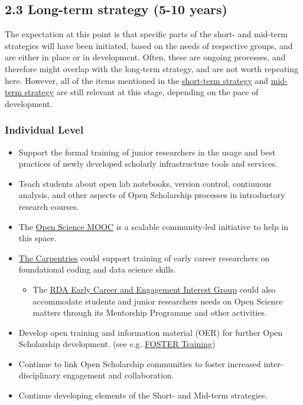 \subsection{2.3 Long-term strategy (5-10 years)
}\label{long-term-strategy-5-10-years}

The expectation at this point is that specific parts of the short- and
mid-term strategies will have been initiated, based on the needs of
respective groups, and are either in place or in development. Often,
these are ongoing processes, and therefore might overlap with the
long-term strategy, and are not worth repeating here. However, all of
the items mentioned in the \protect\hyperlink{Short}{short-term
strategy} and \protect\hyperlink{Middle}{mid-term strategy} are still
relevant at this stage, depending on the pace of development.

\subsubsection{Individual Level}\label{individual-level-2}

\begin{itemize}
\item
  Support the formal training of junior researchers in the usage and
  best practices of newly developed scholarly infrastructure tools and
  services.
\item
  Teach students about open lab notebooks, version control, continuous
  analysis, and other aspects of Open Scholarship processes in
  introductory research courses.
\item
  The \href{https://opensciencemooc.eu/}{Open Science MOOC} is a
  scalable community-led initiative to help in this space.
\item
  \href{https://carpentries.org/}{The Carpentries} could support
  training of early career researchers on foundational coding and data
  science skills.

  \begin{itemize}
  \tightlist
  \item
    The
    \href{https://www.rd-alliance.org/groups/early-career-and-engagement-ig}{RDA
    Early Career and Engagement Interest Group} could also accommodate
    students and junior researchers needs on Open Science matters
    through its Mentorship Programme and other activities.
  \end{itemize}
\item
  Develop open training and information material (OER) for further Open
  Scholarship development. (see e.g.
  \href{https://www.fosteropenscience.eu/resources}{FOSTER Training})
\item
  Continue to link Open Scholarship communities to foster increased
  inter-disciplinary engagement and collaboration.
\item
  Continue developing elements of the Short- and Mid-term strategies.
\end{itemize}

